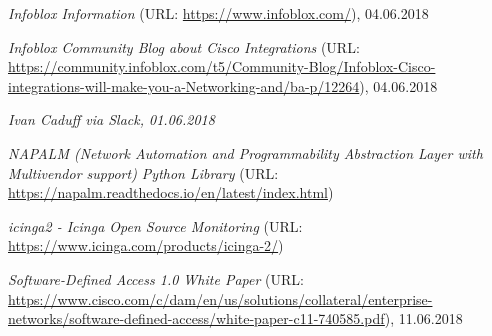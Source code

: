 \begin{thebibliography}{}
	 \textit{Infoblox Information} (URL: \url{https://www.infoblox.com/}), 04.06.2018
	
	 \textit{Infoblox Community Blog about Cisco Integrations} (URL: \url{https://community.infoblox.com/t5/Community-Blog/Infoblox-Cisco-integrations-will-make-you-a-Networking-and/ba-p/12264}), 04.06.2018
	
	 \textit{Ivan Caduff via Slack, 01.06.2018}
	
	 \textit{NAPALM (Network Automation and Programmability Abstraction Layer with Multivendor support) Python Library} (URL: \url{https://napalm.readthedocs.io/en/latest/index.html})
	
	 \textit{icinga2 - Icinga Open Source Monitoring} (URL: \url{https://www.icinga.com/products/icinga-2/})
	
	 \textit{Software-Defined Access 1.0 White Paper} (URL: \url{https://www.cisco.com/c/dam/en/us/solutions/collateral/enterprise-networks/software-defined-access/white-paper-c11-740585.pdf}), 11.06.2018
	
\end{thebibliography}
